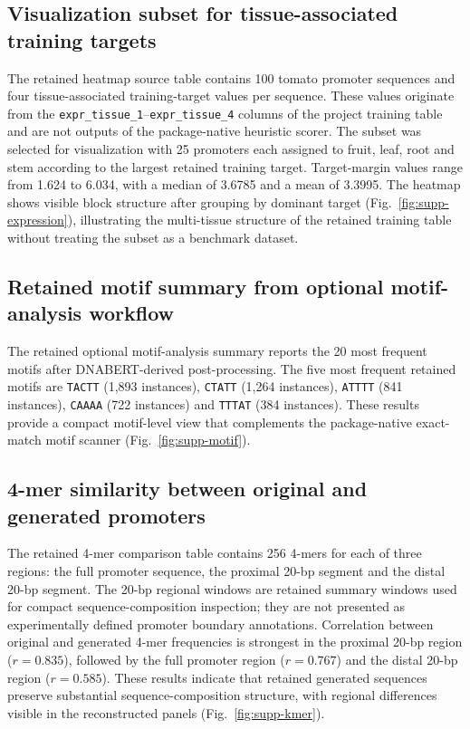 \documentclass[10pt]{article}
\begin{document}
\subsection{Visualization subset for tissue-associated training targets}

The retained heatmap source table contains 100 tomato promoter sequences and four tissue-associated training-target values per sequence. These values originate from the \texttt{expr\_tissue\_1}--\texttt{expr\_tissue\_4} columns of the project training table and are not outputs of the package-native heuristic scorer. The subset was selected for visualization with 25 promoters each assigned to fruit, leaf, root and stem according to the largest retained training target. Target-margin values range from 1.624 to 6.034, with a median of 3.6785 and a mean of 3.3995. The heatmap shows visible block structure after grouping by dominant target (Fig.~\ref{fig:supp-expression}), illustrating the multi-tissue structure of the retained training table without treating the subset as a benchmark dataset.

\subsection{Retained motif summary from optional motif-analysis workflow}

The retained optional motif-analysis summary reports the 20 most frequent motifs after DNABERT-derived post-processing. The five most frequent retained motifs are \texttt{TACTT} (1,893 instances), \texttt{CTATT} (1,264 instances), \texttt{ATTTT} (841 instances), \texttt{CAAAA} (722 instances) and \texttt{TTTAT} (384 instances). These results provide a compact motif-level view that complements the package-native exact-match motif scanner (Fig.~\ref{fig:supp-motif}).

\subsection{4-mer similarity between original and generated promoters}

The retained 4-mer comparison table contains 256 4-mers for each of three regions: the full promoter sequence, the proximal 20-bp segment and the distal 20-bp segment. The 20-bp regional windows are retained summary windows used for compact sequence-composition inspection; they are not presented as experimentally defined promoter boundary annotations. Correlation between original and generated 4-mer frequencies is strongest in the proximal 20-bp region (\(r = 0.835\)), followed by the full promoter region (\(r = 0.767\)) and the distal 20-bp region (\(r = 0.585\)). These results indicate that retained generated sequences preserve substantial sequence-composition structure, with regional differences visible in the reconstructed panels (Fig.~\ref{fig:supp-kmer}).
\end{document}
